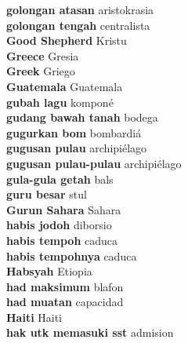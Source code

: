 \textbf{ golongan atasan  } aristokrasia \\
\textbf{ golongan tengah  } centralista \\
\textbf{ Good Shepherd  } Kristu \\
\textbf{ Greece  } Gresia \\
\textbf{ Greek  } Griego \\
\textbf{ Guatemala  } Guatemala \\
\textbf{ gubah lagu  } komponé \\
\textbf{ gudang bawah tanah  } bodega \\
\textbf{ gugurkan bom  } bombardiá \\
\textbf{ gugusan pulau  } archipiélago \\
\textbf{ gugusan pulau-pulau  } archipiélago \\
\textbf{ gula-gula getah  } bals \\
\textbf{ guru besar  } stul \\
\textbf{ Gurun Sahara  } Sahara \\
\textbf{ habis jodoh  } diborsio \\
\textbf{ habis tempoh  } caduca \\
\textbf{ habis tempohnya  } caduca \\
\textbf{ Habsyah  } Etiopia \\
\textbf{ had maksimum  } blafon \\
\textbf{ had muatan  } capacidad \\
\textbf{ Haiti  } Haiti \\
\textbf{ hak utk memasuki sst  } admision \\

